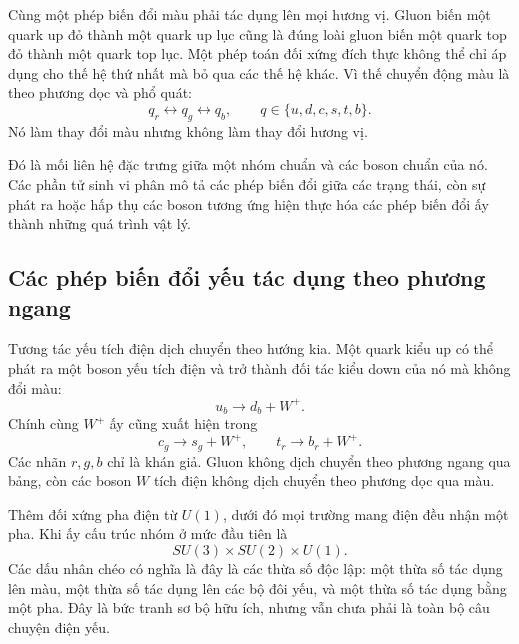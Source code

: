 Cùng một phép biến đổi màu phải tác dụng lên mọi hương vị. Gluon biến một quark up đỏ thành một quark up lục cũng là đúng loài gluon biến một quark top đỏ thành một quark top lục. Một phép toán đối xứng đích thực không thể chỉ áp dụng cho thế hệ thứ nhất mà bỏ qua các thế hệ khác. Vì thế chuyển động màu là theo phương dọc và phổ quát:
\begin{equation}
  q_r\longleftrightarrow q_g\longleftrightarrow q_b,
  \qquad q\in\{u,d,c,s,t,b\}.
\end{equation}
Nó làm thay đổi màu nhưng không làm thay đổi hương vị.

Đó là mối liên hệ đặc trưng giữa một nhóm chuẩn và các boson chuẩn của nó. Các phần tử sinh vi phân mô tả các phép biến đổi giữa các trạng thái, còn sự phát ra hoặc hấp thụ các boson tương ứng hiện thực hóa các phép biến đổi ấy thành những quá trình vật lý.

\subsection{Các phép biến đổi yếu tác dụng theo phương ngang}

Tương tác yếu tích điện dịch chuyển theo hướng kia. Một quark kiểu up có thể phát ra một boson yếu tích điện và trở thành đối tác kiểu down của nó mà không đổi màu:
\begin{equation}
  u_b\longrightarrow d_b+W^+.
\end{equation}
Chính cùng \(W^+\) ấy cũng xuất hiện trong
\begin{equation}
  c_g\longrightarrow s_g+W^+,
  \qquad
  t_r\longrightarrow b_r+W^+.
\end{equation}
Các nhãn \(r,g,b\) chỉ là khán giả. Gluon không dịch chuyển theo phương ngang qua bảng, còn các boson \(W\) tích điện không dịch chuyển theo phương dọc qua màu.

Thêm đối xứng pha điện từ \(U(1)\), dưới đó mọi trường mang điện đều nhận một pha. Khi ấy cấu trúc nhóm ở mức đầu tiên là
\begin{equation}
  SU(3)\times SU(2)\times U(1).
\end{equation}
Các dấu nhân chéo có nghĩa là đây là các thừa số độc lập: một thừa số tác dụng lên màu, một thừa số tác dụng lên các bộ đôi yếu, và một thừa số tác dụng bằng một pha. Đây là bức tranh sơ bộ hữu ích, nhưng vẫn chưa phải là toàn bộ câu chuyện điện yếu.

